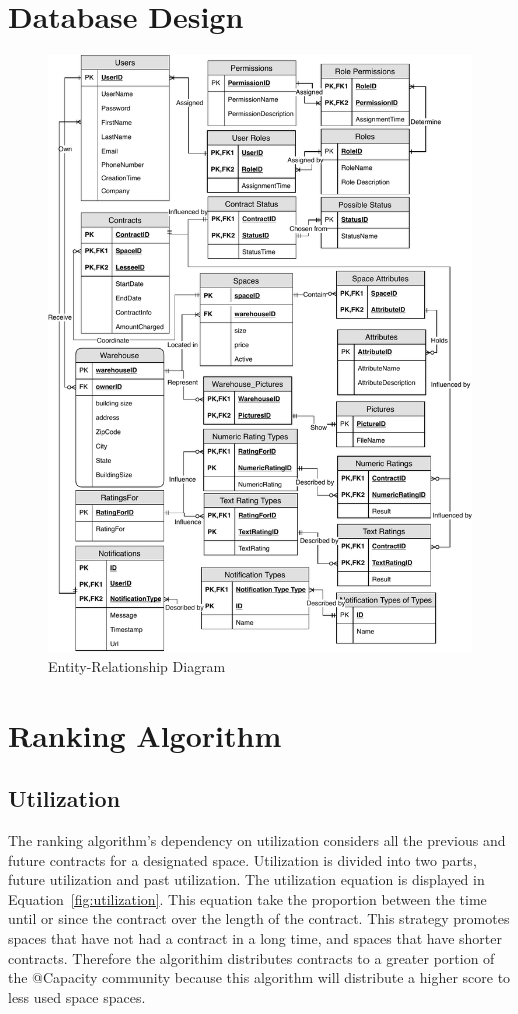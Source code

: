 \appendix

\section{Database Design}

\begin{figure}[tbh]
\centering
\includegraphics[page=1,width=.85\textwidth,height = .7\textheight]{Phase_3/ER_Diagram.pdf} 
\caption{Entity-Relationship Diagram}
\end{figure}

\pagebreak
\section{Ranking Algorithm}

\subsection{Utilization}
The ranking algorithm's dependency on utilization considers all the previous and future contracts for a designated space.  Utilization is divided into two parts, future utilization and past utilization.  The utilization equation is displayed in Equation~\ref{fig:utilization}.  This equation take the proportion between the time until or since the contract over the length of the contract.  This strategy promotes spaces that have not had a contract in a long time, and spaces that have shorter contracts.  Therefore the algorithim distributes contracts to a greater portion of the @Capacity community because this algorithm will distribute a higher score to less used space spaces.


